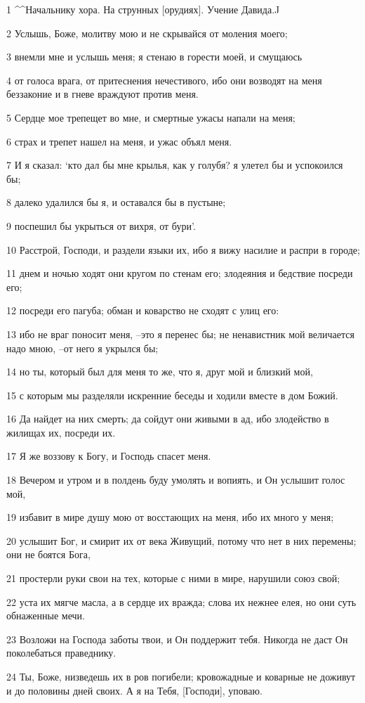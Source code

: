 \par 1 ^^Начальнику хора. На струнных [орудиях]. Учение Давида.^^
\par 2 Услышь, Боже, молитву мою и не скрывайся от моления моего;
\par 3 внемли мне и услышь меня; я стенаю в горести моей, и смущаюсь
\par 4 от голоса врага, от притеснения нечестивого, ибо они возводят на меня беззаконие и в гневе враждуют против меня.
\par 5 Сердце мое трепещет во мне, и смертные ужасы напали на меня;
\par 6 страх и трепет нашел на меня, и ужас объял меня.
\par 7 И я сказал: `кто дал бы мне крылья, как у голубя? я улетел бы и успокоился бы;
\par 8 далеко удалился бы я, и оставался бы в пустыне;
\par 9 поспешил бы укрыться от вихря, от бури'.
\par 10 Расстрой, Господи, и раздели языки их, ибо я вижу насилие и распри в городе;
\par 11 днем и ночью ходят они кругом по стенам его; злодеяния и бедствие посреди его;
\par 12 посреди его пагуба; обман и коварство не сходят с улиц его:
\par 13 ибо не враг поносит меня, --это я перенес бы; не ненавистник мой величается надо мною, --от него я укрылся бы;
\par 14 но ты, который был для меня то же, что я, друг мой и близкий мой,
\par 15 с которым мы разделяли искренние беседы и ходили вместе в дом Божий.
\par 16 Да найдет на них смерть; да сойдут они живыми в ад, ибо злодейство в жилищах их, посреди их.
\par 17 Я же воззову к Богу, и Господь спасет меня.
\par 18 Вечером и утром и в полдень буду умолять и вопиять, и Он услышит голос мой,
\par 19 избавит в мире душу мою от восстающих на меня, ибо их много у меня;
\par 20 услышит Бог, и смирит их от века Живущий, потому что нет в них перемены; они не боятся Бога,
\par 21 простерли руки свои на тех, которые с ними в мире, нарушили союз свой;
\par 22 уста их мягче масла, а в сердце их вражда; слова их нежнее елея, но они суть обнаженные мечи.
\par 23 Возложи на Господа заботы твои, и Он поддержит тебя. Никогда не даст Он поколебаться праведнику.
\par 24 Ты, Боже, низведешь их в ров погибели; кровожадные и коварные не доживут и до половины дней своих. А я на Тебя, [Господи], уповаю.

